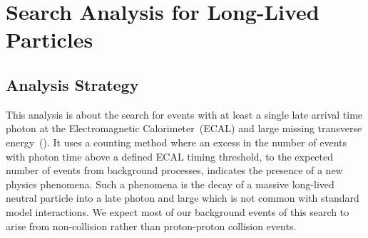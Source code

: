 \chapter{Search Analysis for Long-Lived Particles }
\section{Analysis Strategy}\label{Analysis}
This analysis is about the search for events with at least a single late arrival time photon at the Electromagnetic Calorimeter~(ECAL) and  large missing transverse energy~(\MET). It uses a counting method where an excess in the number of events with photon time above a defined ECAL timing threshold, to the expected number of events from background processes, indicates the presence of a new physics phenomena. Such a phenomena is the decay of a massive long-lived neutral particle into a late photon and large \MET which is not common with standard model interactions. 
\newline
We expect most of our background events of this search to arise from  non-collision rather than proton-proton collision events.
